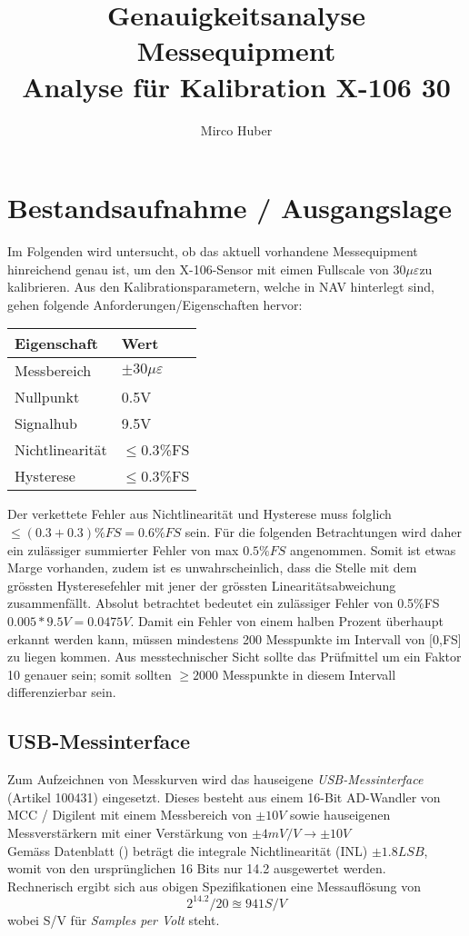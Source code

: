 \documentclass[12pt,a4paper]{article}
\title{Genauigkeitsanalyse Messequipment\\[3ex] \small{Analyse für Kalibration X-106 30\ue}}
\author{Mirco Huber}
\newcommand{\ue}{$\mu\varepsilon$}
\begin{document}
	\maketitle
	\newpage
	\section{Bestandsaufnahme / Ausgangslage}
	Im Folgenden wird untersucht, ob das aktuell vorhandene Messequipment hinreichend genau ist, um den X-106-Sensor mit eimen Fullscale von 30\ue zu kalibrieren. Aus den Kalibrationsparametern, welche in NAV hinterlegt sind, gehen folgende Anforderungen/Eigenschaften hervor:
	\begin{table}[H]
		\centering
		\begin{tabular}{l|l}
			Eigenschaft & Wert \\
			\hline
			Messbereich & $\pm 30$\ue\\
			Nullpunkt & 0.5V\\
			Signalhub & 9.5V\\
			Nichtlinearität & $\le 0.3$\%FS\\ 
			Hysterese & $\le 0.3$\%FS\\ 
		\end{tabular}	
	\end{table}\noindent
	Der verkettete Fehler aus Nichtlinearität und Hysterese muss folglich $\le (0.3+0.3) \%FS = 0.6\%FS$ sein. Für die folgenden Betrachtungen wird daher ein zulässiger summierter Fehler von max $0.5\%FS$ angenommen. Somit ist etwas Marge vorhanden, zudem ist es unwahrscheinlich, dass die Stelle mit dem grössten Hysteresefehler mit jener der grössten Linearitätsabweichung zusammenfällt. Absolut betrachtet bedeutet ein zulässiger Fehler von 0.5\%FS $0.005*9.5V = 0.0475V$. Damit ein Fehler von einem halben Prozent überhaupt erkannt werden kann, müssen mindestens 200 Messpunkte im Intervall von [0,FS] zu liegen kommen. Aus messtechnischer Sicht sollte das Prüfmittel um ein Faktor 10 genauer sein; somit sollten $\ge 2000$ Messpunkte in diesem Intervall differenzierbar sein.
	\subsection{USB-Messinterface}
	Zum Aufzeichnen von Messkurven wird das hauseigene \textit{USB-Messinterface} (Artikel 100431) eingesetzt. Dieses besteht aus einem 16-Bit AD-Wandler von MCC / Digilent mit einem Messbereich von $\pm 10V$ sowie hauseigenen Messverstärkern mit einer Verstärkung von $\pm 4mV/V \rightarrow \pm 10V$\\
	Gemäss Datenblatt () beträgt die integrale Nichtlinearität (INL) $\pm1.8 LSB$, womit von den ursprünglichen 16 Bits nur 14.2 ausgewertet werden.\\
	Rechnerisch ergibt sich aus obigen Spezifikationen eine Messauflösung von
	\begin{equation}
		2^{14.2}/20 \approxeq 941 S/V
	\end{equation}	
	wobei S/V für \textit{Samples per Volt} steht.
\end{document}
